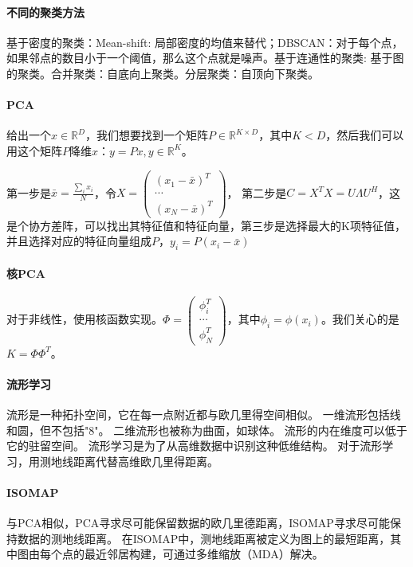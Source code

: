 \paragraph{不同的聚类方法}
基于密度的聚类：Mean-shift: 局部密度的均值来替代；DBSCAN：对于每个点，如果邻点的数目小于一个阈值，那么这个点就是噪声。基于连通性的聚类: 基于图的聚类。合并聚类：自底向上聚类。分层聚类：自顶向下聚类。

\paragraph{PCA}
给出一个$x\in \mathbb{R}^D$，我们想要找到一个矩阵$P \in \mathbb{R}^{K \times D}$，其中$K < D$，然后我们可以用这个矩阵$P$降维$x$：$y = Px, y \in \mathbb{R}^K$。

第一步是$\bar{x} = \frac{\sum_i x_i}{N}$，令$X = \begin{pmatrix}
    (x_1 - \bar{x})^T \\
    \cdots \\
    (x_N - \bar{x})^T
\end{pmatrix}$，
第二步是$C = X^TX = U\Lambda U^H$，这是个协方差阵，可以找出其特征值和特征向量，第三步是选择最大的K项特征值，并且选择对应的特征向量组成$P$，$y_i = P(x_i - \bar{x})$

\paragraph{核PCA}
对于非线性，使用核函数实现。$\Phi = \begin{pmatrix}
    \phi_i^T \\
    \cdots \\
    \phi_N^T
\end{pmatrix}$，其中$\phi_i = \phi(x_i)$。我们关心的是$K = \Phi\Phi^T$。

\paragraph{流形学习}
流形是一种拓扑空间，它在每一点附近都与欧几里得空间相似。
一维流形包括线和圆，但不包括"8"。
二维流形也被称为曲面，如球体。
流形的内在维度可以低于它的驻留空间。
流形学习是为了从高维数据中识别这种低维结构。
对于流形学习，用测地线距离代替高维欧几里得距离。

\paragraph{ISOMAP} 
与PCA相似，PCA寻求尽可能保留数据的欧几里德距离，ISOMAP寻求尽可能保持数据的测地线距离。
在ISOMAP中，测地线距离被定义为图上的最短距离，其中图由每个点的最近邻居构建，可通过多维缩放（MDA）解决。

